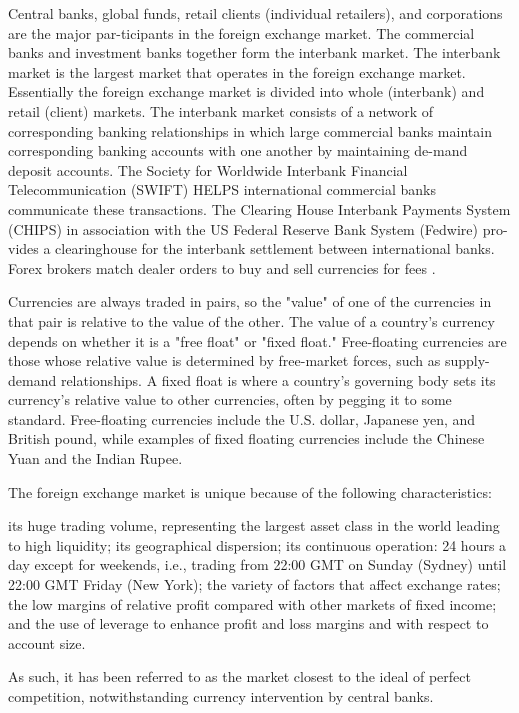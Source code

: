 Central  banks,  global  funds,  retail  clients  (individual  retailers),  and  corporations  are  the  major  par-ticipants in the foreign exchange market. The commercial banks and investment banks together form the interbank market. The interbank market is the largest market that operates in the foreign exchange market.  Essentially  the  foreign  exchange  market  is  divided  into  whole  (interbank)  and  retail  (client)  markets. The interbank market consists of a network of corresponding banking relationships in which large commercial banks maintain corresponding banking accounts with one another by maintaining de-mand deposit accounts. The Society for Worldwide Interbank Financial Telecommunication (SWIFT) HELPS international commercial banks communicate these transactions. The Clearing House Interbank Payments System (CHIPS) in association with the US Federal Reserve Bank System (Fedwire) pro-vides a clearinghouse for the interbank settlement between international banks. Forex brokers match dealer orders to buy and sell currencies for fees \cite{book_forex}.

Currencies are always traded in pairs, so the "value" of one of the currencies in that pair is relative to the value of the other.
The value of a country's currency depends on whether it is a "free float" or "fixed float." Free-floating currencies are those whose relative value is determined by free-market forces, such as supply-demand relationships. A fixed float is where a country's governing body sets its currency's relative value to other currencies, often by pegging it to some standard. Free-floating currencies include the U.S. dollar, Japanese yen, and British pound, while examples of fixed floating currencies include the Chinese Yuan and the Indian Rupee.

The foreign exchange market is unique because of the following characteristics:

    its huge trading volume, representing the largest asset class in the world leading to high liquidity;
    its geographical dispersion;
    its continuous operation: 24 hours a day except for weekends, i.e., trading from 22:00 GMT on Sunday (Sydney) until 22:00 GMT Friday (New York);
    the variety of factors that affect exchange rates;
    the low margins of relative profit compared with other markets of fixed income; and
    the use of leverage to enhance profit and loss margins and with respect to account size.

As such, it has been referred to as the market closest to the ideal of perfect competition, notwithstanding currency intervention by central banks.

